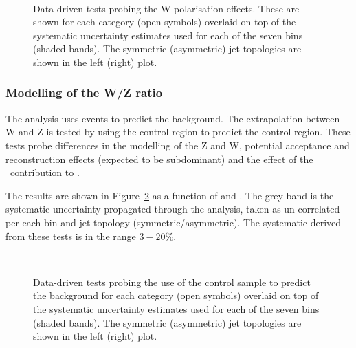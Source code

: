 \begin{figure}[h!]
  \begin{center}
    ~~
    \caption{Data-driven tests probing the W polarisation effects. 
      These are shown for each
      \njet category (open symbols) overlaid on top of the systematic
      uncertainty estimates used for each of the seven \scalht bins
      (shaded bands). 
      The symmetric (asymmetric) jet topologies are shown in the left (right) plot.       
    }
    \label{fig:closureMuPToMuM}
  \end{center} 
\end{figure}

\subsubsection{Modelling of the W/Z ratio}

The \alphat analysis uses \mj events to predict the \znunu background. The extrapolation 
between W and Z is tested by using the \mj control region to predict the \mmj control region.
These tests probe differences in the modelling of the Z and W, potential acceptance and
reconstruction effects (expected to be subdominant) and the effect of 
the \ttbar~contribution to \mj.

The results are shown in Figure~\ref{fig:closureMuToMuMu} as a function of \scalht and \njet. 
The grey band is the systematic uncertainty propagated through the analysis, 
taken as un-correlated per each \scalht bin and jet topology (symmetric/asymmetric). The systematic derived from these tests is
in the range $3-20\%$.



\begin{figure}[h!]
  \begin{center}
    ~~
    \caption{Data-driven tests probing the use of the \mj control sample
      to predict the \znunu background for each
      \njet category (open symbols) overlaid on top of the systematic
      uncertainty estimates used for each of the seven \scalht bins (shaded bands).  
      The symmetric (asymmetric) jet topologies are shown in the left (right) plot. 
    }
    \label{fig:closureMuToMuMu}
  \end{center} 
\end{figure}
